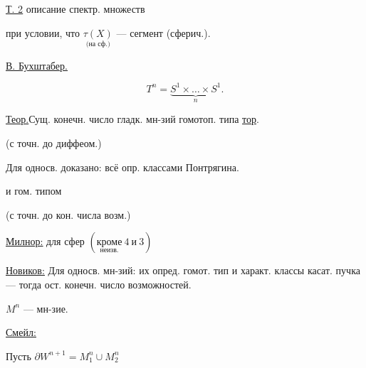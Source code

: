 \underline{\underline{Т. 2}} описание спектр. множеств

при условии, что $\underset{\text{(на сф.)}}{\tau(X)}$ --- сегмент (сферич.).

\begin{center}\end{center}







\underline{\underline{В. Бухштабер.}}

\begin{equation*}T^n=\underbrace{S^1\times\ldots\times S^1}_{n}.\end{equation*}

\underline{\underline{Теор.}}\quad Сущ. конечн. число гладк. мн-зий гомотоп. типа \underline{\underline{тор}}.

(с точн. до диффеом.)

Для односв. доказано: всё опр. классами Понтрягина.

\hfill и гом. типом

\hfill (с точн. до кон. числа возм.)





\underline{\underline{Милнор:}} для сфер $(\underset{\text{неизв.}}{\text{кроме}}\ 4\ \text{и}\ 3)$





\underline{\underline{Новиков:}} Для односв. мн-зий: их опред. гомот. тип и характ. классы касат. пучка --- тогда ост. конечн. число возможностей.

$M^n$ --- мн-зие.

\underline{\underline{Смейл:}}

Пусть $\partial W^{n+1}=M_1^n\cup M_2^n$

